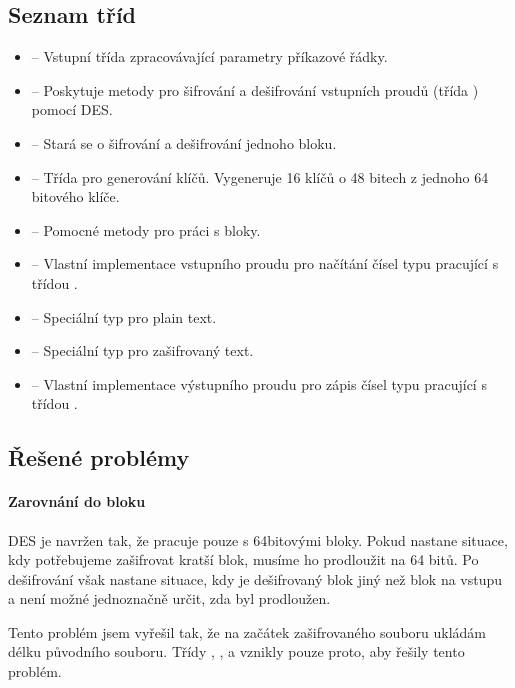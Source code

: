 \documentclass[12pt, a4paper]{article}
\begin{document}
\subsection{Seznam tříd}
\begin{itemize}
	\item {} -- Vstupní třída zpracovávající parametry příkazové řádky.
	\item {} -- Poskytuje metody pro šifrování a dešifrování vstupních proudů (třída ) pomocí DES.
	\item {} -- Stará se o šifrování a dešifrování jednoho bloku.
	\item {} -- Třída pro generování klíčů. Vygeneruje 16 klíčů o 48 bitech z jednoho 64 bitového klíče.
	\item {} -- Pomocné metody pro práci s bloky.
	\item {} -- Vlastní implementace vstupního proudu pro načítání čísel typu  pracující s třídou .
	\item {} -- Speciální typ  pro plain text.
	\item {} -- Speciální typ  pro zašifrovaný text.
	\item {} -- Vlastní implementace výstupního proudu pro zápis čísel typu  pracující s třídou .
\end{itemize}

\subsection{Řešené problémy}
\paragraph{Zarovnání do bloku}
DES je navržen tak, že pracuje pouze s 64bitovými bloky.
Pokud nastane situace, kdy potřebujeme zašifrovat kratší blok, musíme ho prodloužit na 64 bitů.
Po dešifrování však nastane situace, kdy je dešifrovaný blok jiný než blok na vstupu a není možné jednoznačně určit, zda byl prodloužen.

Tento problém jsem vyřešil tak, že na začátek zašifrovaného souboru ukládám délku původního souboru.
Třídy , ,  a  vznikly pouze proto, aby řešily tento problém.
\end{document}
